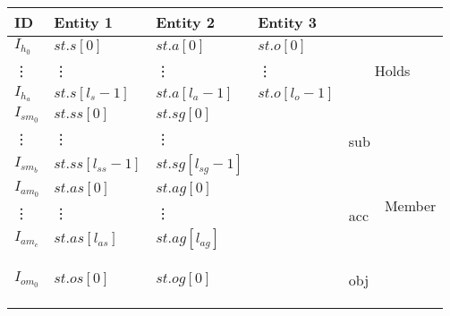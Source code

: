 \documentclass[10pt, twocolumn]{article}
\begin{document}
          \begin{tabular}[t]{|l|l|l|l|l|l|}
            \hline
            \textbf{ID} &
            \textbf{Entity 1} &
            \textbf{Entity 2} &
            \textbf{Entity 3} &
            \multicolumn{2}{|l|}{\textbf{}} \\
            \hline
            $I_{h_{0}}$ &
            $st.s[0]$ &
            $st.a[0]$ &
            $st.o[0]$ &
            \multicolumn{2}{|c|}{\multirow{3}{*}{\begin{sideways}Holds\end{sideways}}} \\
            \vdots & \vdots & \vdots & \vdots & \multicolumn{2}{|c|}{} \\
            $I_{h_{a}}$ &
            $st.s[l_{s}-1]$ &
            $st.a[l_{a}-1]$ &
            $st.o[l_{o}-1]$ &
            \multicolumn{2}{|c|}{} \\
            \hline
            $I_{sm_{0}}$ &
            $st.ss[0]$ &
            $st.sg[0]$ &
            &
            \multirow{3}{*}{\begin{sideways}sub\end{sideways}} &
            \multirow{9}{*}{\begin{sideways}Member\end{sideways}} \\
            \vdots & \vdots & \vdots & & & \\
            $I_{sm_{b}}$ & $st.ss[l_{ss}-1]$ & $st.sg[l_{sg}-1]$ & & & \\
            \cline{1-5}
            $I_{am_{0}}$ &
            $st.as[0]$ &
            $st.ag[0]$ &
            &
            \multirow{3}{*}{\begin{sideways}acc\end{sideways}} & \\
            \vdots & \vdots & \vdots & & & \\
            $I_{am_{c}}$ & $st.as[l_{as}]$ & $st.ag[l_{ag}]$ & & & \\
            \cline{1-5}
            $I_{om_{0}}$ &
            $st.os[0]$ &
            $st.og[0]$ &
            &
            \multirow{3}{*}{\begin{sideways}obj\end{sideways}} & \\

\end{tabular}
\end{document}

